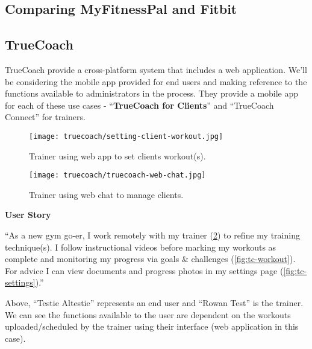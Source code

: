 \subsection{Comparing MyFitnessPal and Fitbit}


\pagebreak
\subsection{TrueCoach}
TrueCoach provide a cross-platform system that includes a web application.
We'll be considering the mobile app provided for end users and making reference
to the functions available to administrators in the process. They provide a mobile app
for each of these use cases - ``\textbf{TrueCoach for Clients}'' and ``TrueCoach Connect'' for trainers.
\begin{figure}[H]
	\centering
	\texttt{[image: truecoach/setting-client-workout.jpg]}
	\caption{Trainer using web app to set clients workout(s).}
	\vspace*{-5mm}
	\label{fig:tc-trainer-set}
\end{figure}
\begin{figure}[H]
	\centering
	\texttt{[image: truecoach/truecoach-web-chat.jpg]}
	\caption{Trainer using web chat to manage clients.}
	\vspace*{-5mm}
	\label{fig:tc-trainer-chat}
\end{figure}
\textbf{User Story}
\label{research-breakdown:tc-usr-story}
\par
``As a new gym go-er, I work remotely with my trainer (\cref{fig:tc-trainer-chat}) to refine my training technique(s).
I follow instructional videos before marking my workouts as complete and monitoring 
my progress via goals \& challenges (\cref{fig:tc-workout}). For advice I can view
documents and progress photos in my settings page (\cref{fig:tc-settings}).''


Above, ``Testie Altestie'' represents an end user and ``Rowan Test'' is the trainer. We can see
the functions available to the user are dependent on the workouts uploaded/scheduled
by the trainer using their interface (web application in this case).
\pagebreak

